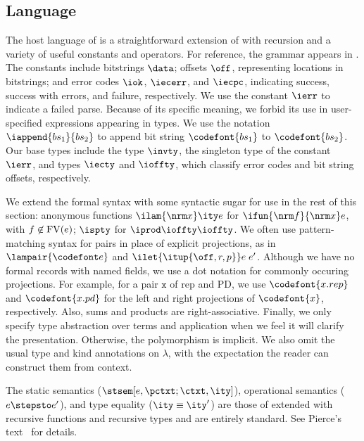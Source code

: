 \subsection{\Implang{} Language}
\label{sec:host-lang}
The host language of \ddc{} is a straightforward 
extension of \fomega{} with recursion and a variety of useful constants
and operators.  
For reference, the grammar appears in .
The constants include bitstrings $\data$; offsets $\off$, representing
locations in bitstrings; and error codes $\iok$, $\iecerr$, and
$\iecpc$, indicating success, success with errors, and failure,
respectively. We use the constant $\ierr$ to indicate a failed parse.
Because of its specific meaning, we forbid its use in user-specified
expressions appearing in \ddc{} types. We use the
notation $\iappend{bs_1}{bs_2}$ to append bit string $\codefont{bs_1}$ to $\codefont{bs_2}$.
Our base types include the type $\invty$, the singleton type of the
constant $\ierr$, and types $\iecty$ and $\ioffty$, which classify
error codes and bit string offsets, respectively.

We extend the formal syntax with some syntactic sugar for use in the
rest of this section: anonymous functions $\ilam {\nrm x} \ity e$ for
$\ifun {\nrm f} {\nrm x} e$, with $f \not\in {\rm FV}(e)$; $\ispty$
for $\iprod \ioffty \ioffty$.  We often use pattern-matching syntax
for pairs in place of explicit projections, as in $\lampair{\codefont
  e}$ and $\ilet {\itup{\off,r,p}} e\; e'$.  Although we have no
formal records with named fields, we use a dot notation for commonly
occuring projections. For example, for a pair $\mathtt x$ of rep and
PD, we use $\codefont{x.rep}$ and $\codefont{x.pd}$ for the left and
right projections of $\codefont{x}$, respectively. Also, sums and
products are right-associative.  Finally, we only specify type
abstraction over terms and application when we feel it will clarify
the presentation. Otherwise, the polymorphism is implicit.  We also
omit the usual type and kind annotations on $\lambda$, with the
expectation the reader can construct them from context.  

The static semantics ($\stsem[e,{\pctxt;\ctxt},\ity]$), operational
semantics ($e \stepsto e'$), and type 
equality ($\ity \equiv \ity'$) are those of \fomega{} extended with
recursive functions and recursive types and are entirely standard.
See Pierce's text~\cite{pierce:tapl} for details.


